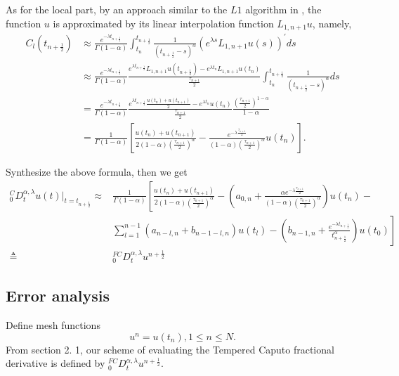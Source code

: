 \documentclass[10pt, reqno]{amsart}
\theoremstyle{remark}
\theoremstyle{definition}
\numberwithin{table}{section}
\begin{document}
As for the local part,  by an approach similar to the $L 1$ algorithm in \cite{sun2006},  the function $u$ is approximated by its linear interpolation function $L_{1,  n+1} u$,  namely, 
\begin{equation}
\begin{aligned} \label{Cl}
C_l\left(t_{n+\frac{1}{2}}\right) & \approx \frac{e^{-\lambda t_{n+\frac{1}{2}}}}{\Gamma(1-\alpha)} \int_{t_{n}}^{t_{n+\frac{1}{2}}} \frac{1}{\left(t_{n+\frac{1}{2}}-s\right)^\alpha}\left(e^{\lambda s} L_{1,  n+1} u(s)\right)^{\prime} d s \\
& \approx \frac{e^{-\lambda t_{n+\frac{1}{2}}}}{\Gamma(1-\alpha)} \frac{e^{\lambda t_{n+\frac{1}{2}}} L_{1,  n+1} u\left(t_{n+\frac{1}{2}}\right)-e^{\lambda t_{n}} L_{1,  n+1} u\left(t_{n}\right)}{\frac{\tau_{n+1}}{2}} \int_{t_{n}}^{t_{n+\frac{1}{2}}} \frac{1}{\left(t_{n+\frac{1}{2}}-s\right)^\alpha} d s \\
&=\frac{e^{-\lambda t_{n+\frac{1}{2}}}}{\Gamma(1-\alpha)} \frac{e^{\lambda t_{n+\frac{1}{2}}}\frac{u(t_{n})+u(t_{n+1})}{2}-e^{\lambda t_{n}}u\left(t_{n}\right)}{\frac{\tau_{n+1}}{2}}\frac{(\frac{\tau_{n+1}}{2})^{1-\alpha}}{1-\alpha}\\
& =\frac{1}{\Gamma(1-\alpha)}\left[\frac{u\left(t_{n}\right)+u\left(t_{n+1}\right)}{2(1-\alpha)(\frac{\tau_{n+1}}{2})^\alpha} -\frac{e^{-\lambda \frac{\tau_{n+1}}{2}}}{(1-\alpha)(\frac{\tau_{n+1}}{2})^\alpha} u\left(t_{n}\right)\right]. 
\end{aligned}
\end{equation}

Synthesize the above formula, then we get
\begin{equation}
\begin{aligned}
{}^C_0D^{\alpha, \lambda}_tu(t)|_{t=t_{n+\frac{1}{2}}}\approx &\frac{1}{\Gamma(1-\alpha)}\left[\frac{u\left(t_{n}\right)+u\left(t_{n+1}\right)}{2(1-\alpha)(\frac{\tau_{n+1}}{2})^\alpha}-(a_{0, n}+\frac{\alpha e^{-\lambda \frac{\tau_{n+1}}{2}} }{(1-\alpha)(\frac{\tau_{n+1}}{2})^\alpha})u\left(t_{n}\right)-\right. \\
    &\left. \sum_{l=1}^{n-1}(a_{n-l, n}+b_{n-1-l, n})u(t_l)-(b_{n-1, n}+\frac{e^{-\lambda t_{n+\frac{1}{2}}}}{t_{n+\frac{1}{2}}^\alpha})u(t_0)\right]\\
    \triangleq& { }_0^{FC}D_t^{\alpha,  \lambda} u^{n+\frac{1}{2}}
\end{aligned}
\end{equation}

\subsection{Error analysis}
Define mesh functions
$$
u^n=u(t_n), 1\leq n \leq N. $$
From section 2. 1, our scheme of evaluating the Tempered Caputo fractional derivative is defined by ${ }_0^{FC}D_t^{\alpha,  \lambda} u^{n+\frac{1}{2}}$. 
\end{document}
